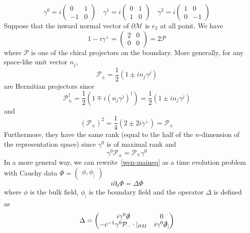 \begin{equation*}
\gamma^0 = i\begin{pmatrix} 0 & 1 \\ -1 & 0 \end{pmatrix}  \quad
\gamma^1 = i\begin{pmatrix} 0 & 1 \\ 1 & 0 \end{pmatrix}  \quad
\gamma^2 = i\begin{pmatrix} 1 & 0 \\ 0 & -1 \end{pmatrix}  
\end{equation*}
Suppose that the inward normal vector of $\partial \mathcal{M}$ is $e_2$ at all point.
We have
\begin{equation*}
1 - i\gamma^\bot = 
\begin{pmatrix} 2 & 0 \\ 0 & 0\end{pmatrix} = 2 \mathcal{P}
\end{equation*}
where $\mathcal{P}$ is one of the chiral projectors on the boundary. 
More generally, for any space-like unit vector $n_j$,
\begin{equation*}
\mathcal{P}_\pm = \frac{1}{2}(1 \pm i n_j\gamma^j) 
\end{equation*}
are Hermitian projectors since 
\begin{equation*}
\mathcal{P}_\pm^\dagger = 
\frac{1}{2}(1 \mp i (n_j \gamma^j)^\dagger)=
\frac{1}{2}(1 \pm i n_j \gamma^j)
\end{equation*}
and
\begin{equation*}
(\mathcal{P}_\pm)^{2} = \frac{1}{4}(2\pm 2i \gamma^\bot) = \mathcal{P}_\pm
\end{equation*}
Furthermore, they have the same rank (equal to the half of the $n$-dimension of the representation space) since $\gamma^0$ is of maximal rank and
\begin{equation*}
\gamma^0\mathcal{P}_\pm = \mathcal{P}_\mp\gamma^0
\end{equation*}
In a more general way, 
we can rewrite~\cref{wen-maineq} as a time evolution problem with Cauchy data
$\Phi = \begin{pmatrix}
\phi, \phi_|
\end{pmatrix}$
\begin{equation*}
i\partial_0 \Phi = \Delta \Phi
\end{equation*}
where $\phi$ is the bulk field, $\phi_|$ is the boundary field and the operator $\Delta$ is defined as
\begin{equation}\label{wen-hamiltonian}
\Delta = \begin{pmatrix}
i \gamma^0 \slashed{\partial}  & 0 \\
-c^{-1} \gamma^0 \mathcal{P}_- \cdot \vert_{\partial M}&  i\gamma^0 \slashed{\partial}_|
\end{pmatrix}
\end{equation}
